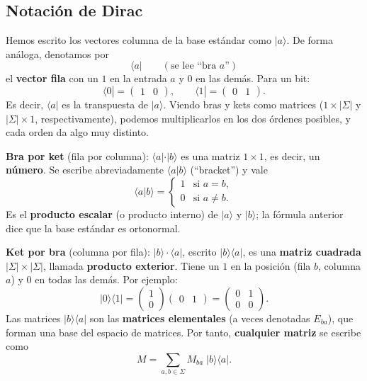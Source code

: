 \documentclass[11pt, a4paper, twoside, openright]{report}
\begin{document}
\subsection{Notación de Dirac}

\noindent Hemos escrito los vectores columna de la base estándar como $|a\rangle$. De forma análoga, denotamos por
\[ \langle a| \qquad (\text{se lee ``bra } a\text{''}) \]
el \textbf{vector fila} con un $1$ en la entrada $a$ y $0$ en las demás. Para un bit:
\[ \langle 0| = \begin{pmatrix} 1 & 0 \end{pmatrix}, \qquad \langle 1| = \begin{pmatrix} 0 & 1 \end{pmatrix}. \]
Es decir, $\langle a|$ es la transpuesta de $|a\rangle$. Viendo bras y kets como matrices ($1 \times |\Sigma|$ y $|\Sigma| \times 1$, respectivamente), podemos multiplicarlos en los dos órdenes posibles, y cada orden da algo muy distinto.

\begin{tcolorbox}[colback=teal!5!white,colframe=teal!75!black,title=\textbf{Definición: Producto bra-ket (producto interno) y producto ket-bra (producto exterior)}]
\textbf{Bra por ket} (fila por columna): $\langle a| \cdot |b\rangle$ es una matriz $1 \times 1$, es decir, un \textbf{número}. Se escribe abreviadamente $\langle a | b \rangle$ (``bracket'') y vale
\[ \langle a | b \rangle = \begin{cases} 1 & \text{si } a = b, \\ 0 & \text{si } a \neq b. \end{cases} \]
Es el \textbf{producto escalar} (o producto interno) de $|a\rangle$ y $|b\rangle$; la fórmula anterior dice que la base estándar es ortonormal.

\textbf{Ket por bra} (columna por fila): $|b\rangle \cdot \langle a|$, escrito $|b\rangle\langle a|$, es una \textbf{matriz cuadrada} $|\Sigma| \times |\Sigma|$, llamada \textbf{producto exterior}. Tiene un $1$ en la posición (fila $b$, columna $a$) y $0$ en todas las demás. Por ejemplo:
\[ |0\rangle\langle 1| = \begin{pmatrix} 1 \\ 0 \end{pmatrix}\begin{pmatrix} 0 & 1 \end{pmatrix} = \begin{pmatrix} 0 & 1 \\ 0 & 0 \end{pmatrix}. \]
Las matrices $|b\rangle\langle a|$ son las \textbf{matrices elementales} (a veces denotadas $E_{ba}$), que forman una base del espacio de matrices. Por tanto, \textbf{cualquier matriz} se escribe como
\[ M = \sum_{a, b \in \Sigma} M_{ba}\; |b\rangle\langle a|. \]
\end{tcolorbox}
\end{document}
